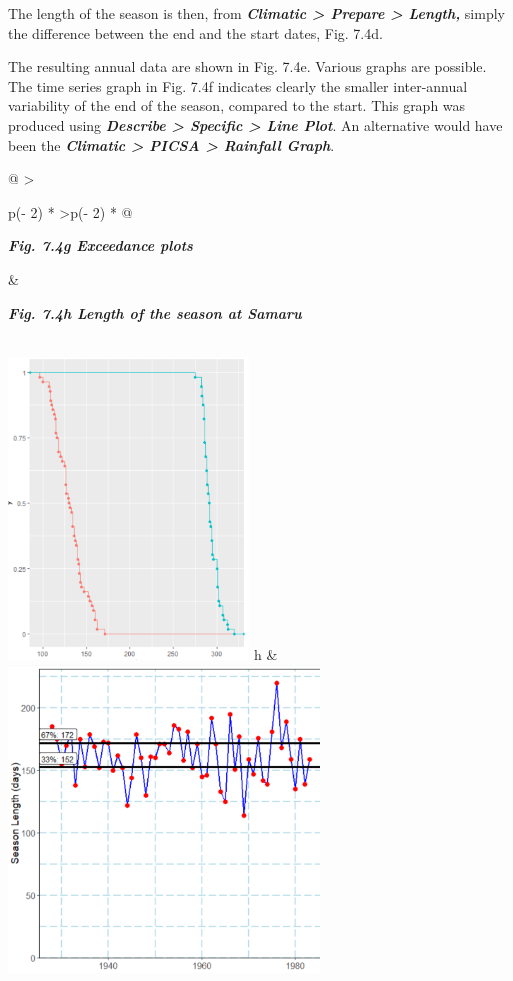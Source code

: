 \documentclass[
  letterpaper,
  DIV=11,
  numbers=noendperiod]{scrreprt}
\begin{document}
The length of the season is then, from \textbf{\emph{Climatic
\textgreater{} Prepare \textgreater{} Length,}} simply the difference
between the end and the start dates, Fig. 7.4d.

The resulting annual data are shown in Fig. 7.4e. Various graphs are
possible. The time series graph in Fig. 7.4f indicates clearly the
smaller inter-annual variability of the end of the season, compared to
the start. This graph was produced using \textbf{\emph{Describe
\textgreater{} Specific \textgreater{} Line Plot}}. An alternative would
have been the \textbf{\emph{Climatic \textgreater{} PICSA \textgreater{}
Rainfall Graph}}.

\begin{longtable}[]{@{}
  >{\raggedright\arraybackslash}p{(\columnwidth - 2\tabcolsep) * }
  >{\raggedleft\arraybackslash}p{(\columnwidth - 2\tabcolsep) * }@{}}
\toprule\noalign{}
\begin{minipage}[b]{\linewidth}\raggedright
\textbf{\emph{Fig. 7.4g Exceedance plots}}
\end{minipage} & \begin{minipage}[b]{\linewidth}\raggedleft
\textbf{\emph{Fig. 7.4h Length of the season at Samaru}}
\end{minipage} \\
\midrule\noalign{}
\endhead
\bottomrule\noalign{}
\endlastfoot
\includegraphics[width=2.51428in,height=3.16009in]{figures/Fig7.4g.png}
h &
\includegraphics[width=3.25415in,height=\textheight]{figures/Fig7.4h.png} \\
\end{longtable}
\end{document}

